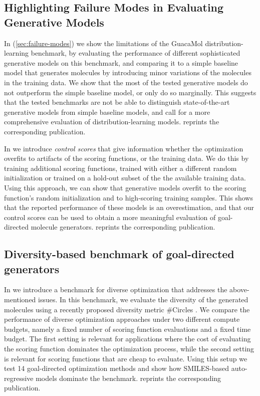 \subsection{Highlighting Failure Modes in Evaluating Generative Models}
In \citep{renzFailureModesMolecule2019} (\cref{sec:failure-modes}) we show the
limitations of the GuacaMol distribution-learning benchmark, by evaluating the
performance of different sophisticated generative models on this benchmark, and
comparing it to a simple baseline model that generates molecules by introducing
minor variations of the molecules in the training data. We show that the 
most of the tested generative models do not outperform the simple baseline
model, or only do so marginally. This suggests that the tested benchmarks
are not be able to distinguish state-of-the-art generative models 
from simple baseline models, and call for a more comprehensive evaluation of
distribution-learning models.  reprints
the corresponding publication.

In \citep{renzFailureModesMolecule2019} we introduce \emph{control scores} that
give information whether the optimization overfits to artifacts of the scoring
functions, or the training data. We do this by training additional scoring
functions, trained with either a different random initialization or trained on a
hold-out subset of the the available training data. Using this approach, we can
show that generative models overfit to the scoring function's random
initialization and to high-scoring training samples. This shows that the reported
performance of these models is an overestimation, and that our control 
scores can be used to obtain a more meaningful evaluation of goal-directed 
molecule generators.  reprints
the corresponding publication.

\subsection{Diversity-based benchmark of goal-directed generators\label{sec:divopt}}
In \citep{renzBenchmarkingEfficiencyGenerative2024} we introduce a benchmark for
diverse optimization that addresses the above-mentioned issues. In this
benchmark, we evaluate the diversity of the generated molecules using a recently
proposed diversity metric \#Circles \citep{xieHowMuchSpace2023}. We compare the
performance of diverse optimization approaches under two different compute
budgets, namely a fixed number of scoring function evaluations and a fixed time
budget. The first setting is relevant for applications where the cost of
evaluating the scoring function dominates the optimization process, while the
second setting is relevant for scoring functions that are cheap to evaluate.
Using this setup we test 14 goal-directed optimization methods and show how
SMILES-based auto-regressive models dominate the benchmark.
 reprints the corresponding publication.

